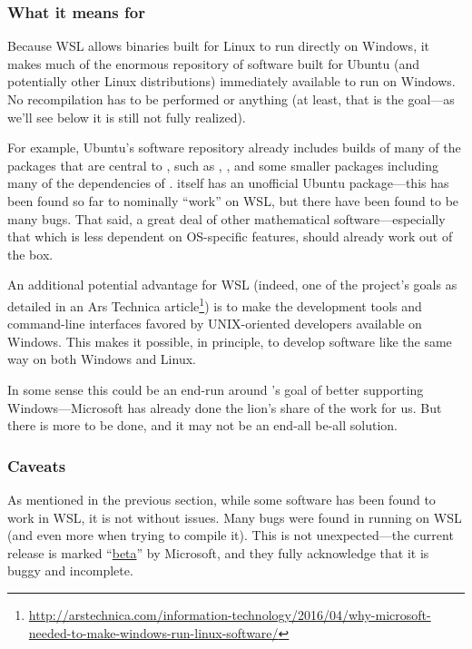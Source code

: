 \documentclass{deliverablereport}
\begin{document}
\subsubsection{What it means for \ODK}

Because WSL allows binaries built for Linux to run directly on
Windows, it makes much of the enormous repository of software built
for Ubuntu (and potentially other Linux distributions) immediately
available to run on Windows.  No recompilation has to be performed or
anything (at least, that is the goal---as we'll see below it is still
not fully realized).

For example, Ubuntu's software repository already includes builds of
many of the packages that are central to \ODK, such as
\href{http://packages.ubuntu.com/trusty/gap}{\GAP},
\href{http://packages.ubuntu.com/trusty/pari-gp}{\Pari}, and some
smaller packages including many of the dependencies of \Sage.  \Sage
itself has an unofficial Ubuntu package---this has been found so far
to nominally ``work'' on WSL, but there have been found to be many
bugs.  That said, a great deal of other mathematical
software---especially that which is less dependent on OS-specific
features, should already work out of the box.

An additional potential advantage for WSL (indeed, one of the
project's goals as detailed in an Ars Technica
article\footnote{\url{http://arstechnica.com/information-technology/2016/04/why-microsoft-needed-to-make-windows-run-linux-software/}})
is to make the development tools and command-line interfaces favored
by UNIX-oriented developers available on Windows.  This makes it
possible, in principle, to develop software like \Sage the same way on
both Windows and Linux.

In some sense this could be an end-run around \ODK's goal of better
supporting Windows---Microsoft has already done the lion's share of
the work for us.  But there is more to be done, and it may not be an
end-all be-all solution.


\subsubsection{Caveats}

As mentioned in the previous section, while some \ODK software has
been found to work in WSL, it is not without issues.  Many bugs were
found in running \Sage on WSL (and even more when trying to compile
it).  This is not unexpected---the current release is marked
``\href{https://msdn.microsoft.com/en-us/commandline/wsl/install_guide}{beta}''
by Microsoft, and they fully acknowledge that it is buggy and
incomplete.
\end{document}
